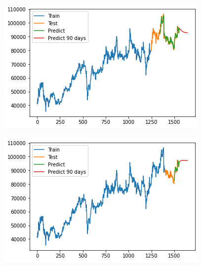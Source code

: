 \documentclass[conference]{IEEEtran}
\begin{document}
\begin{minipage}{0.23\textwidth}
    \centering
    \includegraphics[width=\linewidth]{images/GRU/GRU_VCB_90days_82.png}
    \label{fig:image1}
\end{minipage}
\hfill
\begin{minipage}{0.23\textwidth}
    \centering
    \includegraphics[width=\linewidth]{images/GRU/GRU_VCB_90days_91.png}
    \label{fig:image2}
\end{minipage}
\end{document}
